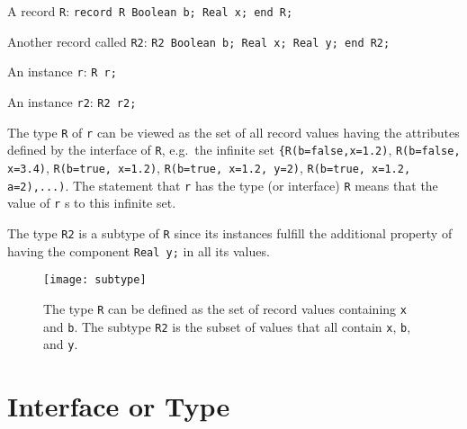 \begin{example}
A record \lstinline!R!: \lstinline!record R Boolean b; Real x; end R;!

Another record called \lstinline!R2!: \lstinline!R2 Boolean b; Real x; Real y; end R2;!

An instance \lstinline!r!: \lstinline!R r;!

An instance \lstinline!r2!: \lstinline!R2 r2;!

The type \lstinline!R! of \lstinline!r! can be viewed as the set of all
record values having the attributes defined by the interface of
\lstinline!R!, e.g.\ the infinite set \lstinline!{R(b=false,x=1.2)!, \lstinline!R(b=false, x=3.4)!,
\lstinline!R(b=true, x=1.2)!, \lstinline!R(b=true, x=1.2, y=2)!,
\lstinline!R(b=true, x=1.2, a=2),...)!. The statement that \lstinline!r! has the type (or
interface) \lstinline!R! means that the value of \lstinline!r! s to this
infinite set.

The type \lstinline!R2! is a subtype of \lstinline!R! since its instances
fulfill the additional property of having the component \lstinline!Real y;!
in all its values.

\begin{figure}[H]
  \begin{center}
    \texttt{[image: subtype]}
  \end{center}
  \caption{The type \lstinline!R! can be defined as the set of record values containing \lstinline!x! and \lstinline!b!.  The subtype \lstinline!R2! is the subset of values that all contain
  \lstinline!x!, \lstinline!b!, and \lstinline!y!.}
\end{figure}
\end{example}

\section{Interface or Type}\label{interface-or-type}


